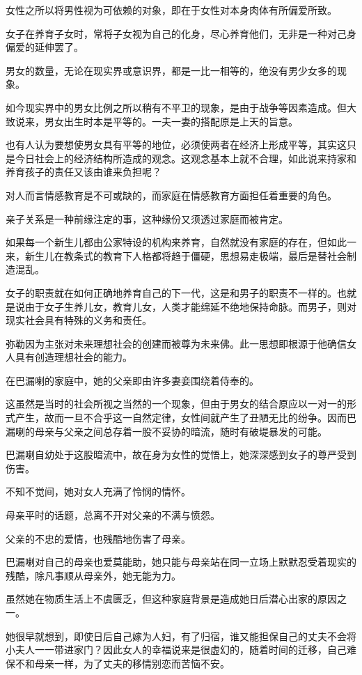 \documentclass[twoside,openany]{book}
\begin{document}
女性之所以将男性视为可依赖的对象，即在于女性对本身肉体有所偏爱所致。

女子在养育子女时，常将子女视为自己的化身，尽心养育他们，无非是一种对己身偏爱的延伸罢了。

男女的数量，无论在现实界或意识界，都是一比一相等的，绝没有男少女多的现象。

如今现实界中的男女比例之所以稍有不平卫的现象，是由于战争等因素造成。但大致说来，男女出生时本是平等的。一夫一妻的搭配原是上天的旨意。

也有人认为要想使男女具有平等的地位，必须使两者在经济上形成平等，其实这只是今日社会上的经济结构所造成的观念。这观念基本上就不合理，如此说来持家和养育孩子的责任又该由谁来负担呢？

对人而言情感教育是不可或缺的，而家庭在情感教育方面担任着重要的角色。

亲子关系是一种前缘注定的事，这种缘份又须透过家庭而被肯定。

如果每一个新生儿都由公家特设的机构来养育，自然就没有家庭的存在，但如此一来，新生儿在教条式的教育下人格都将趋于僵硬，思想易走极端，最后是替社会制造混乱。

女子的职责就在如何正确地养育自己的下一代，这是和男子的职责不一样的。也就是说由于女子生养儿女，教育儿女，人类才能绵延不绝地保持命脉。而男子，则对现实社会具有特殊的义务和责任。

弥勒因为主张对未来理想社会的创建而被尊为未来佛。此一思想即根源于他确信女人具有创造理想社会的能力。

在巴漏喇的家庭中，她的父亲即由许多妻妾围绕着侍奉的。

这虽然是当时的社会所视之当然的一个现象，但由于男女的结合原应以一对一的形式产生，故而一旦不合乎这一自然定律，女性间就产生了丑陋无比的纷争。因而巴漏喇的母亲与父亲之间总存着一股不妥协的暗流，随时有破堤暴发的可能。

巴漏喇自幼处于这股暗流中，故在身为女性的觉悟上，她深深感到女子的尊严受到伤害。

不知不觉间，她对女人充满了怜悯的情怀。

母亲平时的话题，总离不开对父亲的不满与愤怨。

父亲的不忠的爱情，也残酷地伤害了母亲。

巴漏喇对自己的母亲也爱莫能助，她只能与母亲站在同一立场上默默忍受着现实的残酷，除凡事顺从母亲外，她无能为力。

虽然她在物质生活上不虞匮乏，但这种家庭背景是造成她日后潜心出家的原因之一。

她很早就想到，即使日后自己嫁为人妇，有了归宿，谁又能担保自己的丈夫不会将小夫人一一带进家门？因此女人的幸福说来是很虚幻的，随着时间的迁移，自己难保不和母亲一样，为了丈夫的移情别恋而苦恼不安。
\end{document}
